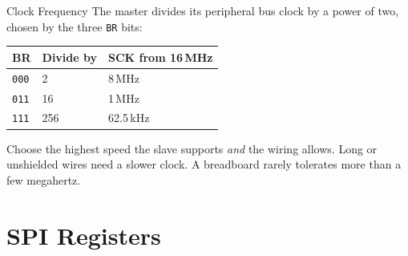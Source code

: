 \documentclass[9pt,aspectratio=169,xcolor=table]{beamer}
\begin{document}
\begin{frame}{Clock Frequency}
    \leavevmode
    The master divides its peripheral bus clock by a power of two, chosen by the three \texttt{BR} bits:

    \vspace{2mm}
    \begin{center}
    \end{center}

    \vspace{2mm}
    \begin{center}
    {\small
    \striped
    \begin{tabular}{@{}l l l@{}}
        \toprule
        \textbf{BR} & \textbf{Divide by} & \textbf{SCK from 16\,MHz} \\
        \midrule
        \texttt{000} & 2 & 8\,MHz \\
        \texttt{011} & 16 & \alert{1\,MHz} \\
        \texttt{111} & 256 & 62.5\,kHz \\
        \bottomrule
    \end{tabular}}
    \end{center}

    \vspace{2mm}
    {\small Choose the highest speed the slave supports \emph{and} the wiring allows. Long or unshielded wires need a slower clock. A breadboard rarely tolerates more than a few megahertz.}
\end{frame}


\section{SPI Registers}
\end{document}

